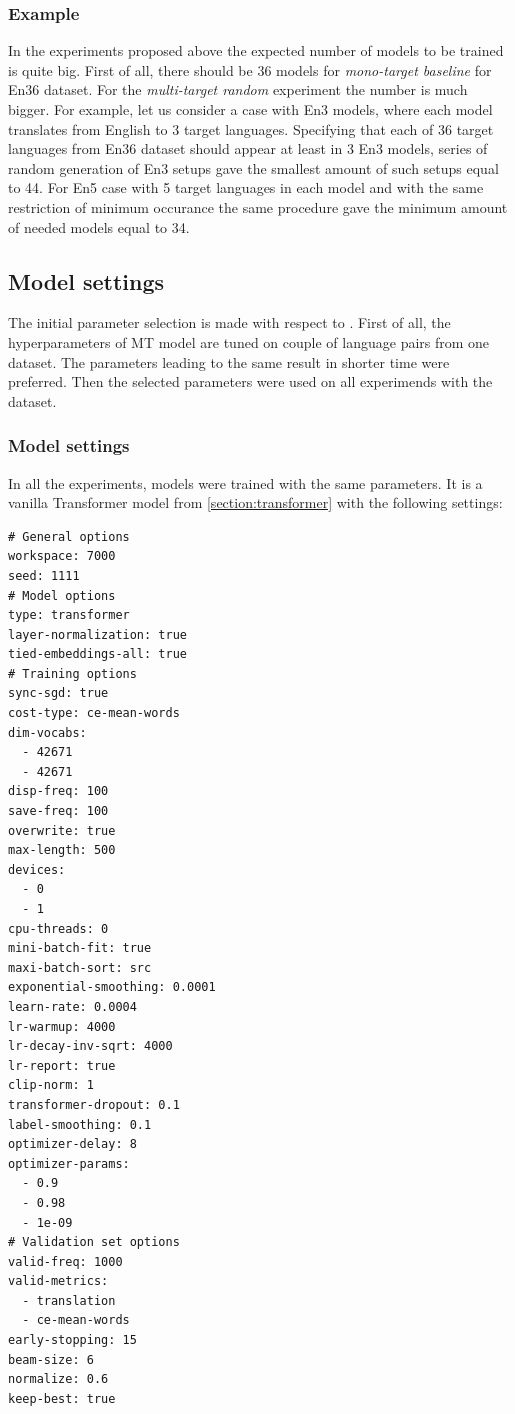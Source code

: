 \subsubsection*{Example}
In the experiments proposed above the expected number of models to be trained is quite big.
First of all, there should be 36 models for \textit{mono-target baseline} for En\to{}36 dataset.
For the \textit{multi-target random} experiment the number is much bigger.
For example, let us consider a case with En\to{}3 models, where each model translates from English to 
3 target languages. Specifying that each of 36 target languages from En\to{}36 dataset
should appear at least in 3 En\to{}3 models, series of random generation of En\to{}3 setups gave
the smallest amount of such setups equal to 44. For En\to{}5 case with 5 target languages in each
model and with the same restriction of minimum occurance the same procedure gave the
minimum amount of needed models equal to 34.



\subsection{Model settings}

The initial parameter selection is made with respect to \cite{training-tips}.
First of all, the hyperparameters of MT model are tuned
on couple of language pairs from one dataset.
The parameters leading to the same result in shorter time were preferred.
Then the selected parameters were used on all experimends with the dataset.

\subsubsection*{Model settings}

In all the experiments, models were trained with the same parameters.
It is a vanilla Transformer model from \cref{section:transformer} with the following
settings:

\begin{verbatim}
# General options
workspace: 7000
seed: 1111
# Model options
type: transformer
layer-normalization: true
tied-embeddings-all: true
# Training options
sync-sgd: true
cost-type: ce-mean-words
dim-vocabs:
  - 42671
  - 42671
disp-freq: 100
save-freq: 100
overwrite: true
max-length: 500
devices:
  - 0
  - 1
cpu-threads: 0
mini-batch-fit: true
maxi-batch-sort: src
exponential-smoothing: 0.0001
learn-rate: 0.0004
lr-warmup: 4000
lr-decay-inv-sqrt: 4000
lr-report: true
clip-norm: 1
transformer-dropout: 0.1
label-smoothing: 0.1
optimizer-delay: 8
optimizer-params:
  - 0.9
  - 0.98
  - 1e-09
# Validation set options
valid-freq: 1000
valid-metrics:
  - translation
  - ce-mean-words
early-stopping: 15
beam-size: 6
normalize: 0.6
keep-best: true
\end{verbatim}

